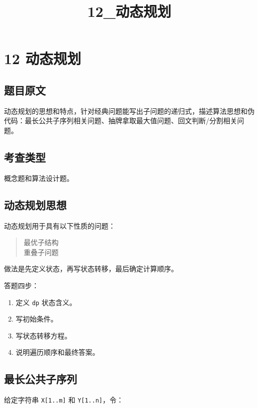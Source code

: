 \documentclass[UTF8,zihao=-4]{ctexart}
\title{12\_动态规划}
\author{}
\date{}
\begin{document}
\maketitle

\section*{12 动态规划}

\subsection*{题目原文}

动态规划的思想和特点，针对经典问题能写出子问题的递归式，描述算法思想和伪代码：最长公共子序列相关问题、抽牌拿取最大值问题、回文判断/分割相关问题。

\subsection*{考查类型}

概念题和算法设计题。

\subsection*{动态规划思想}

动态规划用于具有以下性质的问题：

\begin{quote}
\small\ttfamily\raggedright
\relax 最优子结构\\
\relax 重叠子问题\\
\end{quote}

做法是先定义状态，再写状态转移，最后确定计算顺序。

答题四步：

\begin{enumerate}
\item 定义 \texttt{dp} 状态含义。
\item 写初始条件。
\item 写状态转移方程。
\item 说明遍历顺序和最终答案。
\end{enumerate}

\subsection*{最长公共子序列}

给定字符串 \texttt{X[1..m]} 和 \texttt{Y[1..n]}，令：
\end{document}
